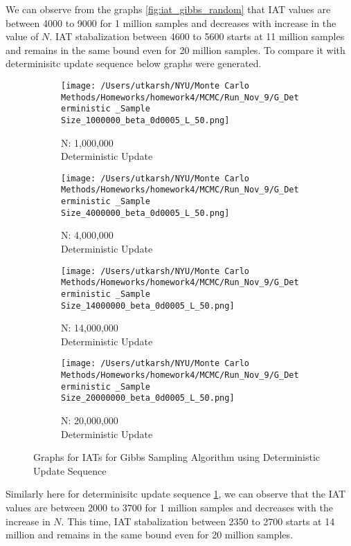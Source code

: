 \documentclass[11pt]{article}
\begin{document}
\noindent We can observe from the graphs \ref{fig:iat_gibbs_random} that IAT values are between 4000 to 9000 for 1 million samples and decreases with increase in the value of $N$. IAT stabalization between 4600 to 5600 starts at 11 million samples and remains in the same bound even for 20 million samples.
To compare it with determinisitc update sequence below graphs were generated.
\begin{figure}[H]
	\centering
	\begin{subfigure}{.22\textwidth}
		\texttt{[image: /Users/utkarsh/NYU/Monte Carlo Methods/Homeworks/homework4/MCMC/Run\_Nov\_9/G\_Deterministic \_Sample Size\_1000000\_beta\_0d0005\_L\_50.png]}
		\caption{N: 1,000,000\\Deterministic Update}
	\end{subfigure}
	\begin{subfigure}{.22\textwidth}
		\texttt{[image: /Users/utkarsh/NYU/Monte Carlo Methods/Homeworks/homework4/MCMC/Run\_Nov\_9/G\_Deterministic \_Sample Size\_4000000\_beta\_0d0005\_L\_50.png]}
		\caption{N: 4,000,000\\Deterministic Update}
	\end{subfigure}
	\begin{subfigure}{.22\textwidth}
		\texttt{[image: /Users/utkarsh/NYU/Monte Carlo Methods/Homeworks/homework4/MCMC/Run\_Nov\_9/G\_Deterministic \_Sample Size\_14000000\_beta\_0d0005\_L\_50.png]}
		\caption{N: 14,000,000\\Deterministic Update}
	\end{subfigure}
	\begin{subfigure}{.22\textwidth}
		\texttt{[image: /Users/utkarsh/NYU/Monte Carlo Methods/Homeworks/homework4/MCMC/Run\_Nov\_9/G\_Deterministic \_Sample Size\_20000000\_beta\_0d0005\_L\_50.png]}
		\caption{N: 20,000,000\\Deterministic Update}
	\end{subfigure}
	\caption{Graphs for IATs for Gibbs Sampling Algorithm using Deterministic Update Sequence}
	\label{fig:iat_gibbs_determinisitc}
\end{figure}
\noindent Similarly here for determinisitc update sequence \ref{fig:iat_gibbs_determinisitc}, we can observe that the 
IAT values are between 2000 to 3700 for 1 million samples and decreases with the increase in $N$. This time, IAT 
stabalization between 2350 to 2700  starts at 14 million and remains in the 
same bound even for 20 million samples.\\
\end{document}
